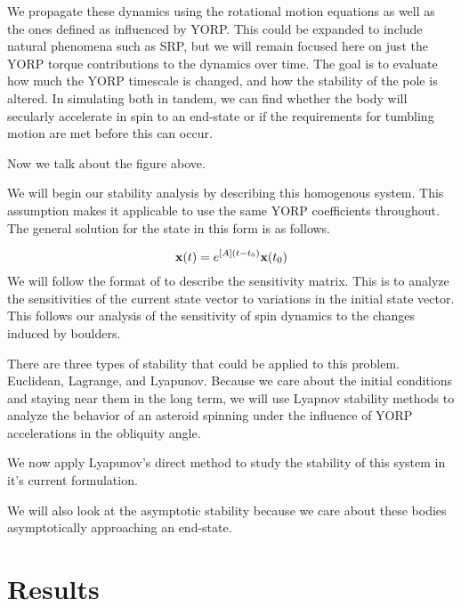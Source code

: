 \documentclass[12pt,notitlepage]{article}
\begin{document}
We propagate these dynamics using the rotational motion equations as well as the ones defined as influenced by YORP. This could be expanded to include natural phenomena such as SRP, but we will remain focused here on just the YORP torque contributions to the dynamics over time. The goal is to evaluate how much the YORP timescale is changed, and how the stability of the pole is altered. In simulating both in tandem, we can find whether the body will secularly accelerate in spin to an end-state or if the requirements for tumbling motion are met before this can occur. 

Now we talk about the figure above. 
      

We will begin our stability analysis by describing this homogenous system. This assumption makes it applicable to use the same YORP coefficients throughout. The general solution for the state in this form is as follows. 

\begin{equation}
    \centering
    \mathbf{x}(t) = e^{[A](t-t_0)}\mathbf{x}(t_0)
\end{equation}
We will follow the format of \cite{Schaub2018} to describe the sensitivity matrix. This is to analyze the sensitivities of the current state vector to variations in the initial state vector. This follows our analysis of the sensitivity of spin dynamics to the changes induced by boulders. 

There are three types of stability that could be applied to this problem. Euclidean, Lagrange, and Lyapunov. Because we care about the initial conditions and staying near them in the long term, we will use Lyapnov stability methods to analyze the behavior of an asteroid spinning under the influence of YORP accelerations in the obliquity angle.

We now apply Lyapunov's direct method to study the stability of this system in it's current formulation. 


We will also look at the asymptotic stability because we care about these bodies asymptotically approaching an end-state. 

\section{Results} \label{results}
\end{document}
